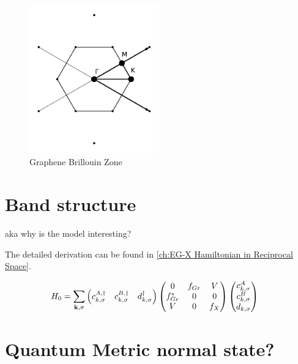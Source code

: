 \documentclass[../main.tex]{subfiles}
\begin{document}
\begin{figure}[t]
	\centering
	\includegraphics[width=0.5\textwidth]{images/graphene brillouin_zone}
	\caption{Graphene Brillouin Zone}
	\label{fig:graphene Brillouin zone}
\end{figure}

\section{Band structure}

aka why is the model interesting?

The detailed derivation can be found in \cref{ch:EG-X Hamiltonian in Reciprocal Space}.

\begin{align}
	H_0 &= \sum_{\bm{\mathrm{k}}, \sigma} \begin{pmatrix} c_{k, \sigma}^{A, \dagger} & c_{k, \sigma}^{B, \dagger} & d_{k, \sigma}^{\dagger} \end{pmatrix}
	\begin{pmatrix}
		0 & f_{Gr} & V \\
		f_{Gr}^* & 0 & 0 \\
		V & 0 & f_{X}
	\end{pmatrix} \begin{pmatrix} c_{k, \sigma}^{A} \\ c_{k, \sigma}^{B} \\ d_{k, \sigma} \end{pmatrix}
	\label{eq:EG-X Hamiltonian non-interacting matrix}
\end{align}

\section{Quantum Metric normal state?}
	
	
\end{document}
